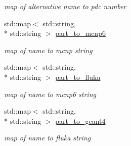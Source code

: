 \begin{DoxyCompactItemize}
\begin{DoxyCompactList}\small\item\em map of alternative name to pdc number \end{DoxyCompactList}\item 
\hypertarget{namespacepyne_1_1particle_a340aac212ae5cf8666cc47654c0889c4}{std\+::map$<$ std\+::string, \\*
std\+::string $>$ \hyperlink{namespacepyne_1_1particle_a340aac212ae5cf8666cc47654c0889c4}{part\+\_\+to\+\_\+mcnp6}}\label{namespacepyne_1_1particle_a340aac212ae5cf8666cc47654c0889c4}

\begin{DoxyCompactList}\small\item\em map of name to mcnp string \end{DoxyCompactList}\item 
\hypertarget{namespacepyne_1_1particle_a670bcdff7df3bec5a47da5a228ef41cf}{std\+::map$<$ std\+::string, \\*
std\+::string $>$ \hyperlink{namespacepyne_1_1particle_a670bcdff7df3bec5a47da5a228ef41cf}{part\+\_\+to\+\_\+fluka}}\label{namespacepyne_1_1particle_a670bcdff7df3bec5a47da5a228ef41cf}

\begin{DoxyCompactList}\small\item\em map of name to mcnp6 string \end{DoxyCompactList}\item 
\hypertarget{namespacepyne_1_1particle_a6032672d7a6469328b8df984e7383eab}{std\+::map$<$ std\+::string, \\*
std\+::string $>$ \hyperlink{namespacepyne_1_1particle_a6032672d7a6469328b8df984e7383eab}{part\+\_\+to\+\_\+geant4}}\label{namespacepyne_1_1particle_a6032672d7a6469328b8df984e7383eab}

\begin{DoxyCompactList}\small\item\em map of name to fluka string \end{DoxyCompactList}\end{DoxyCompactItemize}

